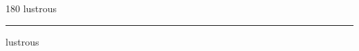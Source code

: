 
\begin{frame}
\begin{center}
\begin{turn}{180}
{\fontsize{2.5cm}{1em}\selectfont lustrous}
\end{turn}
\vspace{1em}\par  
\hrule
\vspace{1em}\par  
{\fontsize{2.5cm}{1em}\selectfont lustrous}
\end{center}
\end{frame}
